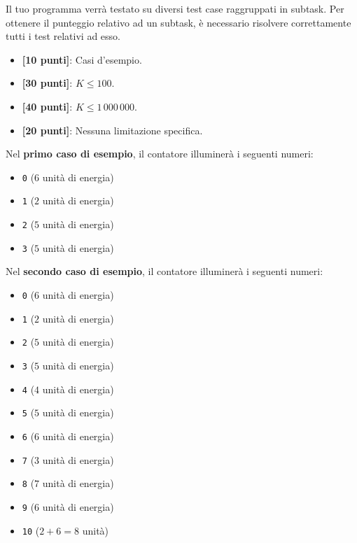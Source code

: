 \Scoring
Il tuo programma verrà testato su diversi test case raggruppati in subtask.
Per ottenere il punteggio relativo ad un subtask, è necessario risolvere
correttamente tutti i test relativi ad esso.

\begin{itemize}[nolistsep,itemsep=2mm]
  \item \textbf{ [10 punti]}: Casi d'esempio.
  \item \textbf{ [30 punti]}: $K \leq 100$.
  \item \textbf{ [40 punti]}: $K \leq 1\,000\,000$.
  \item \textbf{ [20 punti]}: Nessuna limitazione specifica.
\end{itemize}

\Examples
\begin{example}
%
%
%
\end{example}


\Explanation
Nel \textbf{primo caso di esempio}, il contatore illuminerà i seguenti numeri:
\begin{multicols}{3}
\begin{itemize}[noitemsep]
    \item \texttt{0} ($6$ unità di energia)
    \item \texttt{1} ($2$ unità di energia)
    \item \texttt{2} ($5$ unità di energia)
    \item \texttt{3} ($5$ unità di energia)
\end{itemize}
\end{multicols}

Nel \textbf{secondo caso di esempio}, il contatore illuminerà i seguenti numeri:
\begin{multicols}{3}
\begin{itemize}[noitemsep]
    \item \texttt{0} ($6$ unità di energia)
    \item \texttt{1} ($2$ unità di energia)
    \item \texttt{2} ($5$ unità di energia)
    \item \texttt{3} ($5$ unità di energia)
    \item \texttt{4} ($4$ unità di energia)
    \item \texttt{5} ($5$ unità di energia)
    \item \texttt{6} ($6$ unità di energia)
    \item \texttt{7} ($3$ unità di energia)
    \item \texttt{8} ($7$ unità di energia)
    \item \texttt{9} ($6$ unità di energia)
    \item \texttt{10} ($2+6 = 8$ unità)
\end{itemize}
\end{multicols}
